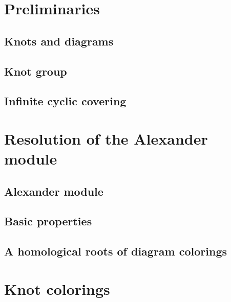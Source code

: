 \documentclass[14pt]{extarticle} %
\begin{document}
\newpage

\section{Preliminaries}

\subsection{Knots and diagrams}



\subsection{Knot group}



\subsection{Infinite cyclic covering}



\section{Resolution of the Alexander module}
\label{section2}

\subsection{Alexander module}
\label{alexander module discussion}



\subsection{Basic properties}



\subsection{A homological roots of diagram colorings}



\section{Knot colorings}
\end{document}
